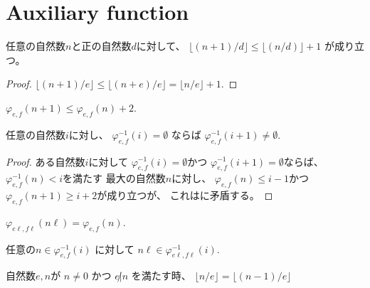 \chapter{Auxiliary function}

\begin{lemma}
\label{lm:nat_succ_div_le}
\leanok
任意の自然数$n$と正の自然数$d$に対して、
$
\lfloor (n+1)/d \rfloor
\le
\lfloor (n/d) \rfloor + 1
$
が成り立つ。
\end{lemma}

\begin{proof}
$
\lfloor (n+1)/e \rfloor
\le
\lfloor (n+e)/e \rfloor
=
\lfloor n/e \rfloor + 1
$.
\end{proof}

\begin{lemma}
\label{lm:φ_n_add_one_le_φ_n_add_two}
\leanok
$\varphi_{e,f}(n+1) \le \varphi_{e,f}(n) + 2$.
\end{lemma}

\begin{lemma}
\label{lm:φinv_i_empty_implies_φinv_i_add_one_nonempty}
任意の自然数$i$に対し、
$\varphi_{e,f}^{-1}(i) = \emptyset$
ならば
$\varphi_{e,f}^{-1}(i+1) \ne \emptyset$.
\end{lemma}

\begin{proof}
ある自然数$i$に対して
$\varphi_{e,f}^{-1}(i) = \emptyset$かつ
$\varphi_{e,f}^{-1}(i+1) = \emptyset$ならば、
$\varphi_{e,f}^{-1}(n) < i$を満たす
最大の自然数$n$に対し、
$\varphi_{e,f}(n) \le i-1$かつ
$\varphi_{e,f}(n+1) \ge i+2$が成り立つが、
これはに矛盾する。
\end{proof}

\begin{lemma}
\label{lm:φ_mul}
\leanok
$\varphi_{e \ell, f \ell}(n \ell) = \varphi_{e,f}(n)$.
\end{lemma}

\begin{lemma}
任意の$n \in \varphi_{e,f}^{-1}(i)$
に対して
$n \ell \in \varphi_{e \ell,f \ell}^{-1}(i)$.
\end{lemma}

\begin{lemma}
\label{lm:not_dvd_mod_eq}
\leanok
自然数$e,n$が
$n \ne 0$
かつ
$e \not | n$
を満たす時、
$\lfloor n / e \rfloor = \lfloor (n-1) / e \rfloor$
\end{lemma}

